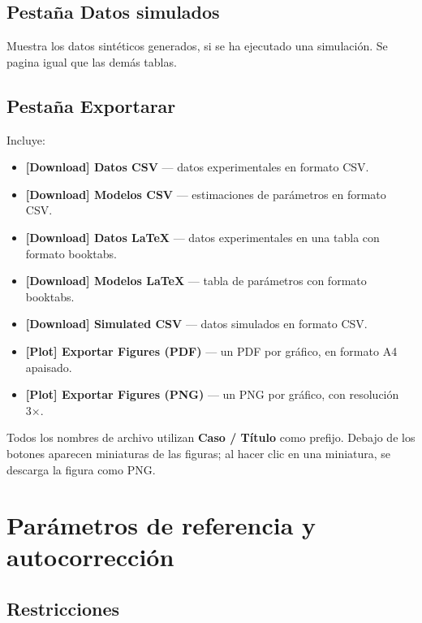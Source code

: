 \documentclass[11pt,a4paper]{article}
\begin{document}
\subsection{Pestaña Datos simulados}

Muestra los datos sintéticos generados, si se ha ejecutado una simulación. Se pagina igual que las demás tablas.

\subsection{Pestaña Exportarar}

Incluye:
\begin{itemize}[leftmargin=1.4em]
  \item \textbf{\textbf{[Download]} Datos CSV} --- datos experimentales en formato CSV.
  \item \textbf{\textbf{[Download]} Modelos CSV} --- estimaciones de parámetros en formato CSV.
  \item \textbf{\textbf{[Download]} Datos LaTeX} --- datos experimentales en una tabla con formato booktabs.
  \item \textbf{\textbf{[Download]} Modelos LaTeX} --- tabla de parámetros con formato booktabs.
  \item \textbf{\textbf{[Download]} Simulated CSV} --- datos simulados en formato CSV.
  \item \textbf{\textbf{[Plot]} Exportar Figures (PDF)} --- un PDF por gráfico, en formato A4 apaisado.
  \item \textbf{\textbf{[Plot]} Exportar Figures (PNG)} --- un PNG por gráfico, con resolución 3×.
\end{itemize}

Todos los nombres de archivo utilizan \textbf{Caso / Título} como prefijo. Debajo de los botones aparecen miniaturas de las figuras; al hacer clic en una miniatura, se descarga la figura como PNG.

\section{Parámetros de referencia y autocorrección}

\subsection{Restricciones}
\end{document}
